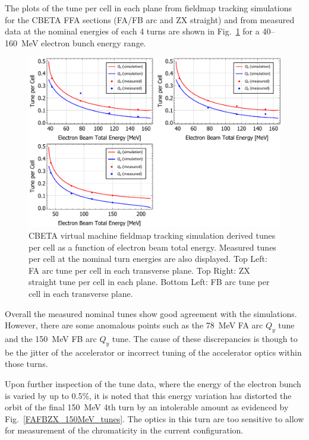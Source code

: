 \documentclass[../main.tex]{subfiles}
\begin{document}
The plots of the tune per cell in each plane from fieldmap tracking simulations for the CBETA FFA sections (FA/FB arc and ZX straight) and from measured data at the nominal energies of each 4 turns are shown in Fig.~\ref{fig:fieldmap_chromaticity_tune} for a 40--160~\si{\mega\electronvolt} electron bunch energy range.
\begin{figure}[!h]
\centering
\includegraphics[width=\textwidth]{Figures/CBETA_Multi-Pass_Commissioning/FAFBZX_nominal_tunes.pdf}
\caption{CBETA virtual machine fieldmap tracking simulation derived tunes per cell as a function of electron beam total energy. Measured tunes per cell at the nominal turn energies are also displayed. Top Left: FA arc tune per cell in each transverse plane. Top Right: ZX straight tune per cell in each plane. Bottom Left: FB arc tune per cell in each transverse plane. }
\label{fig:fieldmap_chromaticity_tune}
\end{figure}

Overall the measured nominal tunes show good agreement with the simulations. However, there are some anomalous points such as the 78~\si{\mega\electronvolt} FA arc $Q_{y}$ tune and the 150~\si{\mega\electronvolt} FB arc $Q_{y}$ tune. The cause of these discrepancies is though to be the jitter of the accelerator or incorrect tuning of the accelerator optics within those turns.

Upon further inspection of the tune data, where the energy of the electron bunch is varied by up to 0.5\%, it is noted that this energy variation has distorted the orbit of the final 150~\si{\mega\electronvolt} 4th turn by an intolerable amount as evidenced by Fig.~\ref{FAFBZX_150MeV_tunes}. The optics in this turn are too sensitive to allow for measurement of the chromaticity in the current configuration.
\end{document}
